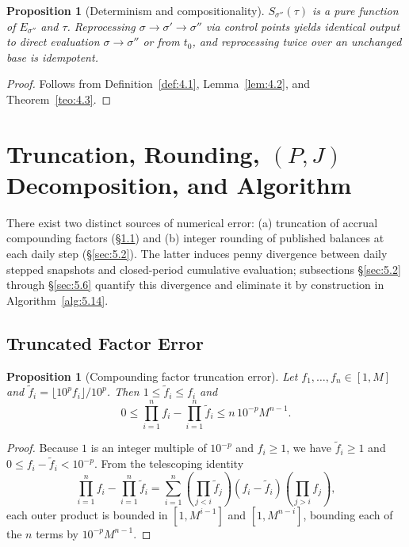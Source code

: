 \documentclass[11pt, a4paper]{article}
\theoremstyle{definition}
\theoremstyle{plain}
\newtheorem{proposicao}[definicao]{Proposition}
\theoremstyle{remark}
\begin{document}
\begin{proposicao}[Determinism and compositionality]\label{prop:4.9}
$S_{\sigma''}(\tau)$ is a pure function of $E_{\sigma''}$ and $\tau$. Reprocessing $\sigma \to \sigma' \to \sigma''$ via control points yields identical output to direct evaluation $\sigma \to \sigma''$ or from $t_0$, and reprocessing twice over an unchanged base is idempotent.
\end{proposicao}
\begin{proof}
Follows from Definition~\ref{def:4.1}, Lemma~\ref{lem:4.2}, and Theorem~\ref{teo:4.3}.
\end{proof}

\section{Truncation, Rounding, \texorpdfstring{$(P, J)$}{(P, J)} Decomposition, and Algorithm}\label{sec:5}

There exist two distinct sources of numerical error: (a) truncation of accrual compounding factors (\S\ref{sec:5.1}) and (b) integer rounding of published balances at each daily step (\S\ref{sec:5.2}). The latter induces penny divergence between daily stepped snapshots and closed-period cumulative evaluation; subsections \S\ref{sec:5.2} through \S\ref{sec:5.6} quantify this divergence and eliminate it by construction in Algorithm~\ref{alg:5.14}.

\subsection{Truncated Factor Error}\label{sec:5.1}

\begin{proposicao}[Compounding factor truncation error]\label{prop:5.1}
Let $f_1, \dots, f_n \in [1, M]$ and $\tilde{f}_i = \lfloor 10^p f_i \rfloor / 10^p$. Then $1 \le \tilde{f}_i \le f_i$ and
\[
0 \le \prod_{i=1}^{n} f_i - \prod_{i=1}^{n} \tilde{f}_i \le n \, 10^{-p} M^{n-1}.
\]
\end{proposicao}
\begin{proof}
Because $1$ is an integer multiple of $10^{-p}$ and $f_i \ge 1$, we have $\tilde{f}_i \ge 1$ and $0 \le f_i - \tilde{f}_i < 10^{-p}$. From the telescoping identity
\[
\prod_{i=1}^{n} f_i - \prod_{i=1}^{n} \tilde{f}_i = \sum_{i=1}^{n} \left(\prod_{j < i} \tilde{f}_j\right) (f_i - \tilde{f}_i) \left(\prod_{j > i} f_j\right),
\]
each outer product is bounded in $[1, M^{i-1}]$ and $[1, M^{n-i}]$, bounding each of the $n$ terms by $10^{-p} M^{n-1}$.
\end{proof}
\end{document}
